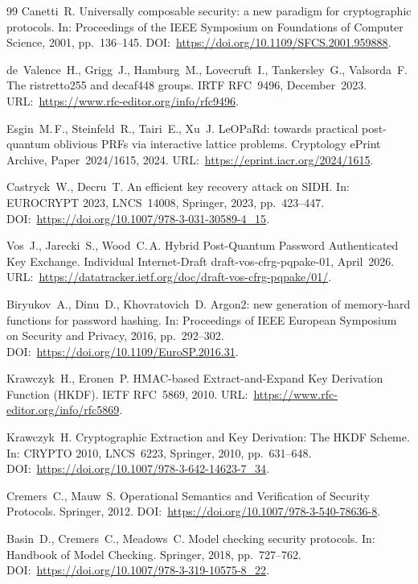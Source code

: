 \documentclass{ieeeijc}
\theoremstyle{remark}
\begin{document}
\begin{thebibliography}{99}
Canetti~R.
Universally composable security: a new paradigm for cryptographic protocols.
In: Proceedings of the IEEE Symposium on Foundations of Computer Science, 2001, pp.~136--145.
DOI:~\url{https://doi.org/10.1109/SFCS.2001.959888}.

de~Valence~H., Grigg~J., Hamburg~M., Lovecruft~I., Tankersley~G.,
Valsorda~F.
The ristretto255 and decaf448 groups.
IRTF RFC~9496, December~2023.
URL:~\url{https://www.rfc-editor.org/info/rfc9496}.

Esgin~M.\,F., Steinfeld~R., Tairi~E., Xu~J.
LeOPaRd: towards practical post-quantum oblivious PRFs via interactive lattice problems.
Cryptology ePrint Archive, Paper~2024/1615, 2024.
URL:~\url{https://eprint.iacr.org/2024/1615}.

Castryck~W., Decru~T.
An efficient key recovery attack on SIDH.
In: EUROCRYPT 2023, LNCS~14008, Springer, 2023, pp.~423--447.
DOI:~\url{https://doi.org/10.1007/978-3-031-30589-4_15}.

Vos~J., Jarecki~S., Wood~C.\,A.
Hybrid Post-Quantum Password Authenticated Key Exchange.
Individual Internet-Draft draft-vos-cfrg-pqpake-01, April~2026.
URL:~\url{https://datatracker.ietf.org/doc/draft-vos-cfrg-pqpake/01/}.

Biryukov~A., Dinu~D., Khovratovich~D.
Argon2: new generation of memory-hard functions for password hashing.
In: Proceedings of IEEE European Symposium on Security and Privacy, 2016, pp.~292--302.
DOI:~\url{https://doi.org/10.1109/EuroSP.2016.31}.

Krawczyk~H., Eronen~P.
HMAC-based Extract-and-Expand Key Derivation Function (HKDF).
IETF RFC~5869, 2010.
URL:~\url{https://www.rfc-editor.org/info/rfc5869}.

Krawczyk~H.
Cryptographic Extraction and Key Derivation: The HKDF Scheme.
In: CRYPTO 2010, LNCS~6223, Springer, 2010, pp.~631--648.
DOI:~\url{https://doi.org/10.1007/978-3-642-14623-7_34}.

Cremers~C., Mauw~S.
Operational Semantics and Verification of Security Protocols.
Springer, 2012.
DOI:~\url{https://doi.org/10.1007/978-3-540-78636-8}.

Basin~D., Cremers~C., Meadows~C.
Model checking security protocols.
In: Handbook of Model Checking. Springer, 2018, pp.~727--762.
DOI:~\url{https://doi.org/10.1007/978-3-319-10575-8_22}.


\end{thebibliography}
\end{document}
